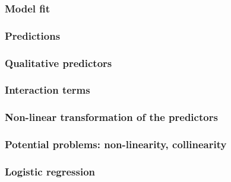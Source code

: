 \documentclass[]{article}
\begin{document}
\hypertarget{model-fit}{%
\subsubsection{Model fit}\label{model-fit}}

\hypertarget{predictions}{%
\subsubsection{Predictions}\label{predictions}}

\hypertarget{qualitative-predictors}{%
\subsubsection{Qualitative predictors}\label{qualitative-predictors}}

\hypertarget{interaction-terms}{%
\subsubsection{Interaction terms}\label{interaction-terms}}

\hypertarget{non-linear-transformation-of-the-predictors}{%
\subsubsection{Non-linear transformation of the
predictors}\label{non-linear-transformation-of-the-predictors}}

\hypertarget{potential-problems-non-linearity-collinearity}{%
\subsubsection{Potential problems: non-linearity,
collinearity}\label{potential-problems-non-linearity-collinearity}}

\hypertarget{logistic-regression}{%
\subsubsection{Logistic regression}\label{logistic-regression}}
\end{document}
